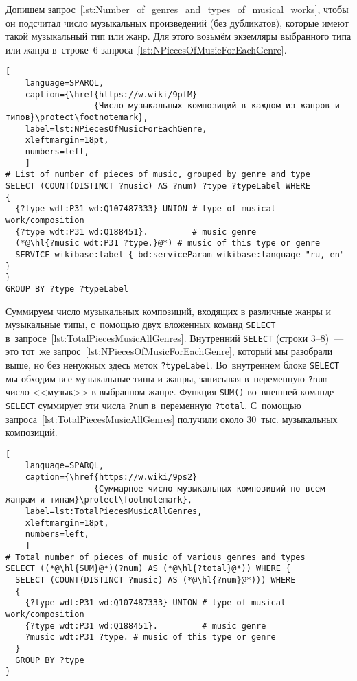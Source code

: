 Допишем запрос~\ref{lst:Number_of_genres_and_types_of_musical_works}, 
чтобы он подсчитал число музыкальных произведений (без дубликатов), 
которые имеют такой музыкальный тип или жанр. 
Для этого возьмём экземляры выбранного типа или жанра в~строке~6 
запроса~\ref{lst:NPiecesOfMusicForEachGenre}.
\begin{lstlisting}[ 
    language=SPARQL,
    caption={\href{https://w.wiki/9pfM}
                  {Число музыкальных композиций в каждом из жанров и типов}\protect\footnotemark},
    label=lst:NPiecesOfMusicForEachGenre,
    xleftmargin=18pt,
    numbers=left,
    ]
# List of number of pieces of music, grouped by genre and type
SELECT (COUNT(DISTINCT ?music) AS ?num) ?type ?typeLabel WHERE
{                
  {?type wdt:P31 wd:Q107487333} UNION # type of musical work/composition
  {?type wdt:P31 wd:Q188451}.         # music genre
  (*@\hl{?music wdt:P31 ?type.}@*) # music of this type or genre
  SERVICE wikibase:label { bd:serviceParam wikibase:language "ru, en" }
}
GROUP BY ?type ?typeLabel
\end{lstlisting}%

Суммируем число музыкальных композиций, входящих в различные жанры и музыкальные типы, 
с~помощью двух вложенных команд \lstinline|SELECT| в~запросе~\ref{lst:TotalPiecesMusicAllGenres}. 
% 
Внутренний \lstinline|SELECT| (строки 3--8)~--- это тот~же запрос~\ref{lst:NPiecesOfMusicForEachGenre}, 
который мы разобрали выше, но без ненужных здесь меток \lstinline|?typeLabel|. 
Во~внутреннем блоке \lstinline|SELECT| мы обходим все музыкальные типы и жанры, 
записывая в~переменную \lstinline|?num| число <<музык>> в выбранном жанре. 
% 
Функция \lstinline|SUM()| во~внешней команде \lstinline|SELECT| 
суммирует эти числа \lstinline|?num| в~переменную \lstinline|?total|. 
С~помощью запроса~\ref{lst:TotalPiecesMusicAllGenres} получили около 30~тыс. музыкальных композиций.


\begin{lstlisting}[ 
    language=SPARQL,
    caption={\href{https://w.wiki/9ps2}
                  {Суммарное число музыкальных композиций по всем жанрам и типам}\protect\footnotemark},
    label=lst:TotalPiecesMusicAllGenres,
    xleftmargin=18pt,
    numbers=left,
    ]
# Total number of pieces of music of various genres and types
SELECT ((*@\hl{SUM}@*)(?num) AS (*@\hl{?total}@*)) WHERE {
  SELECT (COUNT(DISTINCT ?music) AS (*@\hl{?num}@*))) WHERE
  {                
    {?type wdt:P31 wd:Q107487333} UNION # type of musical work/composition
    {?type wdt:P31 wd:Q188451}.         # music genre
    ?music wdt:P31 ?type. # music of this type or genre
  }
  GROUP BY ?type
}
\end{lstlisting}%


